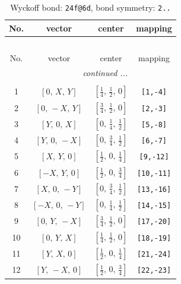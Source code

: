 \documentclass[fleqn,8pt]{jsarticle}
\begin{document}
\begin{longtable}{cccc}
\caption{Wyckoff bond: {\tt 24f@6d}, bond symmetry: {\tt 2..}}
 \\
 \hline \hline
No. & vector & center & mapping \\ \hline \endfirsthead

\multicolumn{3}{l}{\tablename\ \thetable{}} \\
 \hline \hline
No. & vector & center & mapping \\ \hline \endhead

 \hline \hline
\multicolumn{3}{r}{\footnotesize\it continued ...} \\ \endfoot

 \hline \hline
\multicolumn{3}{r}{} \\ \endlastfoot

1 & $\left[ 0,\, X,\, Y \right]$ & $\left[ \frac{1}{4},\, \frac{1}{2},\, 0 \right]$ & {\tt [1,-4]} \\ \hline
2 & $\left[ 0,\, - X,\, Y \right]$ & $\left[ \frac{3}{4},\, \frac{1}{2},\, 0 \right]$ & {\tt [2,-3]} \\ \hline
3 & $\left[ Y,\, 0,\, X \right]$ & $\left[ 0,\, \frac{1}{4},\, \frac{1}{2} \right]$ & {\tt [5,-8]} \\ \hline
4 & $\left[ Y,\, 0,\, - X \right]$ & $\left[ 0,\, \frac{3}{4},\, \frac{1}{2} \right]$ & {\tt [6,-7]} \\ \hline
5 & $\left[ X,\, Y,\, 0 \right]$ & $\left[ \frac{1}{2},\, 0,\, \frac{1}{4} \right]$ & {\tt [9,-12]} \\ \hline
6 & $\left[ - X,\, Y,\, 0 \right]$ & $\left[ \frac{1}{2},\, 0,\, \frac{3}{4} \right]$ & {\tt [10,-11]} \\ \hline
7 & $\left[ X,\, 0,\, - Y \right]$ & $\left[ 0,\, \frac{3}{4},\, \frac{1}{2} \right]$ & {\tt [13,-16]} \\ \hline
8 & $\left[ - X,\, 0,\, - Y \right]$ & $\left[ 0,\, \frac{1}{4},\, \frac{1}{2} \right]$ & {\tt [14,-15]} \\ \hline
9 & $\left[ 0,\, Y,\, - X \right]$ & $\left[ \frac{3}{4},\, \frac{1}{2},\, 0 \right]$ & {\tt [17,-20]} \\ \hline
10 & $\left[ 0,\, Y,\, X \right]$ & $\left[ \frac{1}{4},\, \frac{1}{2},\, 0 \right]$ & {\tt [18,-19]} \\ \hline
11 & $\left[ Y,\, X,\, 0 \right]$ & $\left[ \frac{1}{2},\, 0,\, \frac{1}{4} \right]$ & {\tt [21,-24]} \\ \hline
12 & $\left[ Y,\, - X,\, 0 \right]$ & $\left[ \frac{1}{2},\, 0,\, \frac{3}{4} \right]$ & {\tt [22,-23]} \\ \hline

\end{longtable}
\end{document}
